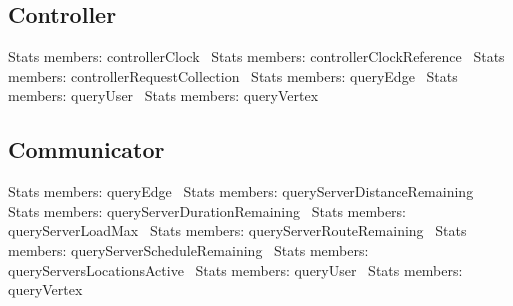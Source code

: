 \subsection{Controller}
\nwenddocs{}\endmoddef{}
\LA{}Stats members: controllerClock~{\nwtagstyle{}}\RA{}
\LA{}Stats members: controllerClockReference~{\nwtagstyle{}}\RA{}
\LA{}Stats members: controllerRequestCollection~{\nwtagstyle{}}\RA{}
\LA{}Stats members: queryEdge~{\nwtagstyle{}}\RA{}
\LA{}Stats members: queryUser~{\nwtagstyle{}}\RA{}
\LA{}Stats members: queryVertex~{\nwtagstyle{}}\RA{}
\nwendcode{}\nwdocspar

\subsection{Communicator}
\nwenddocs{}\endmoddef{}
\LA{}Stats members: queryEdge~{\nwtagstyle{}}\RA{}
\LA{}Stats members: queryServerDistanceRemaining~{\nwtagstyle{}}\RA{}
\LA{}Stats members: queryServerDurationRemaining~{\nwtagstyle{}}\RA{}
\LA{}Stats members: queryServerLoadMax~{\nwtagstyle{}}\RA{}
\LA{}Stats members: queryServerRouteRemaining~{\nwtagstyle{}}\RA{}
\LA{}Stats members: queryServerScheduleRemaining~{\nwtagstyle{}}\RA{}
\LA{}Stats members: queryServersLocationsActive~{\nwtagstyle{}}\RA{}
\LA{}Stats members: queryUser~{\nwtagstyle{}}\RA{}
\LA{}Stats members: queryVertex~{\nwtagstyle{}}\RA{}
\nwendcode{}\nwdocspar

